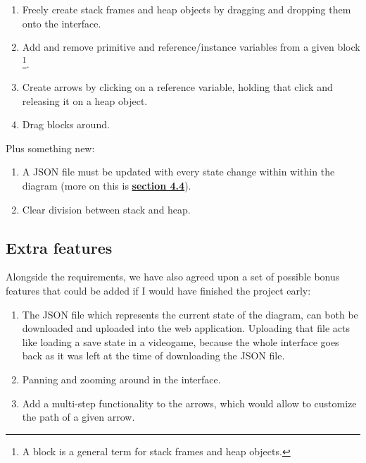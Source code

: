 \documentclass[]{usiinfbachelorproject}
\begin{document}
\begin{enumerate}
	\item Freely create stack frames and heap objects by dragging and dropping them onto the interface.
	\item Add and remove primitive and reference/instance variables from a given block \footnote{A block is a general term for stack frames and heap objects.}.
	\item Create arrows by clicking on a reference variable, holding that click and releasing it on a heap object.
	\item Drag blocks around.
\end{enumerate}

\pagebreak
\vspace{\fill}

\noindent Plus something new:

\begin{enumerate}
	\item A JSON file must be updated with every state change within within the diagram (more on this is \hyperref[storing states]{\textbf{section 4.4}}).
	\item Clear division between stack and heap.
\end{enumerate}

\subsection{Extra features}

Alongside the requirements, we have also agreed upon a set of possible bonus features that could be added if I would have finished the project early:

\begin{enumerate}
	\item The JSON file which represents the current state of the diagram, can both be downloaded and uploaded into the web application. Uploading that file acts like loading a save state in a videogame, because the whole interface goes back as it was left at the time of downloading the JSON file.
	\item Panning and zooming around in the interface.
	\item Add a multi-step functionality to the arrows, which would allow to customize the path of a given arrow.
\end{enumerate}

\vspace{\fill}

\pagebreak
\end{document}
